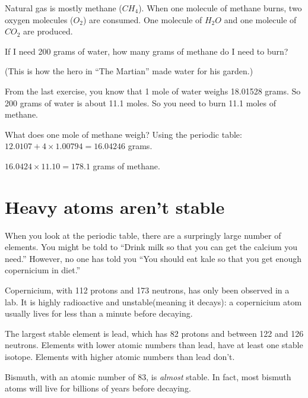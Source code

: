 \begin{Exercise}[title={Burning Methane}, label=burning_methane]
  
Natural gas is mostly methane ($CH_4$). When one molecule of methane
burns, two oxygen molecules ($O_2$) are consumed. One molecule of
$H_2O$ and one molecule of $CO_2$ are produced.

If I need 200 grams of water, how many grams of methane do I need
to burn?

(This is how the hero in ``The Martian'' made water for his garden.)

\end{Exercise}
\begin{Answer}[ref=burning_methane]

From the last exercise, you know that 1 mole of water weighs 18.01528
grams. So 200 grams of water is about 11.1 moles. So you need to burn
11.1 moles of methane.

What does one mole of methane weigh? Using the periodic table:
$12.0107 + 4 \times 1.00794 = 16.04246$ grams.

$16.0424 \times 11.10 = 178.1$ grams of methane.
   
\end{Answer}

\section{Heavy atoms aren't stable}

When you look at the periodic table, there are a surpringly large
number of elements. You might be told to ``Drink milk so that you can
get the calcium you need.'' However, no one has told you ``You should
eat kale so that you get enough copernicium in diet.''

Copernicium, with 112 protons and 173 neutrons, has only been observed
 in a lab. It is highly radioactive and unstable(meaning it decays): a copernicium
atom usually lives for less than a minute before decaying.

The largest stable element is lead, which has 82 protons and between
122 and 126 neutrons. Elements with lower atomic numbers than lead,
have at least one stable isotope. Elements with higher atomic numbers
than lead don't.

Bismuth, with an atomic number of 83, is \textit{almost} stable. In fact, most
bismuth atoms will live for billions of years before decaying.
